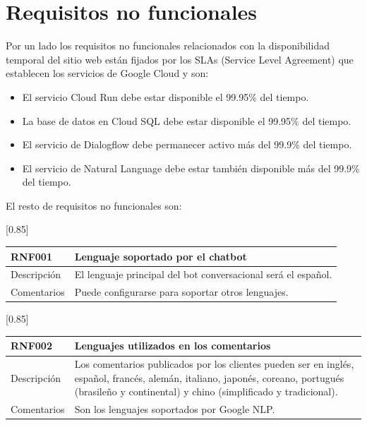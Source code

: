 \section{Requisitos no funcionales}

Por un lado los requisitos no funcionales relacionados con la disponibilidad temporal del sitio web están fijados por los SLAs (Service Level Agreement) que establecen los servicios de Google Cloud y son:
\begin{itemize}
    \item El servicio Cloud Run debe estar disponible el 99.95\% del tiempo.
    \item La base de datos en Cloud SQL debe estar disponible el 99.95\% del tiempo.
    \item El servicio de Dialogflow debe permanecer activo más del 99.9\% del tiempo.
    \item El servicio de Natural Language debe estar también disponible más del 99.9\% del tiempo.
\end{itemize}

\newpage

El resto de requisitos no funcionales son:

\begin{table}[htbp]
  \centering
  \scalebox{0.85}[0.85] {
    \begin{tabular}{l p{32.145em}}
    \toprule
    \textbf{RNF001} & \textbf{Lenguaje soportado por el chatbot} \\
    \midrule
    Descripción & El lenguaje principal del bot conversacional será el español. \\
    Comentarios & Puede configurarse para soportar otros lenguajes. \\
    \midrule
    \end{tabular}%
  }
  \label{tab:rnf001}
\end{table}%

\begin{table}[htbp]
  \centering
  \scalebox{0.85}[0.85] {
    \begin{tabular}{l p{32.145em}}
    \toprule
    \textbf{RNF002} & \textbf{Lenguajes utilizados en los comentarios} \\
    \midrule
    Descripción & Los comentarios publicados por los clientes pueden ser en inglés, español, francés, alemán, italiano, japonés, coreano, portugués (brasileño y continental) y chino (simplificado y tradicional). \\
    Comentarios & Son los lenguajes soportados por Google NLP. \\
    \midrule
    \end{tabular}%
  }
  \label{tab:rnf002}
\end{table}%


